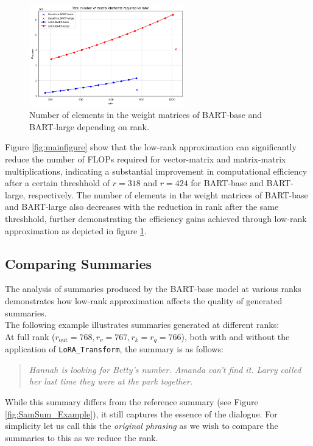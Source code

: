 \begin{figure}[H]
    \centering
    \includegraphics[width=0.6\textwidth]{figs/elements.png}
    \caption{Number of elements in the weight matrices of BART-base and BART-large depending on rank.}
    \label{fig:parameters}
\end{figure}
Figure \ref{fig:mainfigure}  show that the low-rank approximation can significantly reduce the number of FLOPs required for vector-matrix and matrix-matrix multiplications, indicating a substantial improvement in computational efficiency after a certain threshhold of \(r = 318\) and \(r = 424\) for BART-base and BART-large, respectively. The number of elements in the weight matrices of BART-base and BART-large also decreases with the reduction in rank after the same threshhold, further demonstrating the efficiency gains achieved through low-rank approximation as depicted in figure \ref{fig:parameters}.

\subsection{Comparing Summaries}

The analysis of summaries produced by the BART-base model at various ranks demonstrates how low-rank approximation affects the quality of generated summaries. \\
The following example illustrates summaries generated at different ranks: \\
At full rank (\(r_{\text{out}} = 768, r_{v} = 767, r_{k} = r_{q} = 766\)), both with and without the application of \texttt{LoRA\_Transform}, the summary is as follows:
\begin{quote}
\textit{Hannah is looking for Betty's number. Amanda can't find it. Larry called her last time they were at the park together.}
\end{quote}
While this summary differs from the reference summary (see Figure \ref{fig:SamSum_Example}), it still captures the essence of the dialogue. For simplicity let us call this the \emph{original phrasing} as we wish to compare the summaries to this as we reduce the rank.\\

